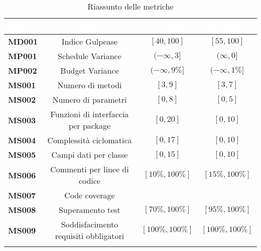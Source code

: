 	\renewcommand{\arraystretch}{1.5}
	\begin{longtable}{C{4cm} c c c}
	
	\textcolor{white}{\textbf{Codice}} &
	\textcolor{white}{\textbf{Nome}} &
	\textcolor{white}{\textbf{Accettabile}} &
	\textcolor{white}{\textbf{Ottimale}}\\
	\endhead

	\textbf{MD001} &
	Indice Gulpease &
	$[40 , 100] $&
	$[55 , 100]$\\

	\textbf{MP001} &
	Schedule Variance &
	$(-\infty , 3] $&
	$(\infty , 0]$\\
	
	\textbf{MP002} &
	Budget Variance &
	$(-\infty , 9\%] $&
	$(-\infty , 1\%]$\\


	\textbf{MS001} &
	Numero di metodi &
	$[3 , 9] $&
	$[3 , 7]$\\
	
	\textbf{MS002} &
	Numero di parametri &
	$[0 , 8] $&
	$[0 , 5]$\\
	
	\textbf{MS003} &
	Funzioni di interfaccia per package &
	$[0 , 20] $&
	$[0 , 10]$\\
	
	\textbf{MS004} &
	Complessità ciclomatica &
	$[0 , 17] $&
	$[0 , 10]$\\
	
	\textbf{MS005} &
	Campi dati per classe &
	$[0 , 15] $&
	$[0 , 10]$\\
	
	\textbf{MS006} &
	Commenti per linee di codice &
	$[10\%, 100\%] $&
	$[15\% , 100\%]$\\
	
	\textbf{MS007} &
	Code coverage &
	&
	\\
	
	\textbf{MS008} &
	Superamento test &
	$[70\%, 100\%]$&
	$[95\%, 100\%]$\\
	
	\textbf{MS009} &
	Soddisfacimento requisiti obbligatori &
	$[100\%, 100\%]$&
	$[100\%, 100\%]$\\
	
	\caption{Riassunto delle metriche}\\	
	\end{longtable}